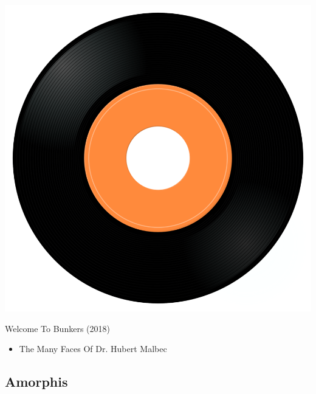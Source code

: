 \begin{minipage}[t]{0.25\textwidth}\vspace{0pt}
\captionsetup{type=figure}
\includegraphics[width=\textwidth]{Images/cover.png}
\caption*{Welcome To Bunkers (2018)}
\end{minipage}
\begin{minipage}[t]{0.25\textwidth}\vspace{0pt}
\begin{itemize}[nosep,leftmargin=1em,labelwidth=*,align=left]
	\setlength{\itemsep}{0pt}
	\item The Many Faces Of Dr. Hubert Malbec
\end{itemize}
\end{minipage}

\subsection{Amorphis}

